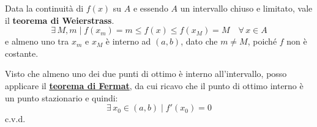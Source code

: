 \documentclass[../../analisi1]{subfiles}
\begin{document}
                Data la continuità di \(f(x)\) su \(A\) e essendo \(A\) un intervallo chiuso e limitato, vale il \textbf{teorema di Weierstrass}.
                \[ \exists \, M, m \; | \; f(x_m)=m \leqslant f(x) \leqslant f(x_M) = M \quad \forall \, x \in A \]
                e almeno uno tra \(x_m\) e \(x_M\) è interno ad \( (a,b) \), dato che \( m \neq M \), poiché \( f \) non è costante.
                
                Visto che almeno uno dei due punti di ottimo è interno all'intervallo, posso applicare il \textbf{\hyperref[teoFermat]{teorema di Fermat}}, da cui ricavo che il punto di ottimo interno è un punto stazionario e quindi:
                \[\exists \, x_0 \in (a,b) \; | \; f'(x_0) = 0 \]
                c.v.d.

    
\end{document}
